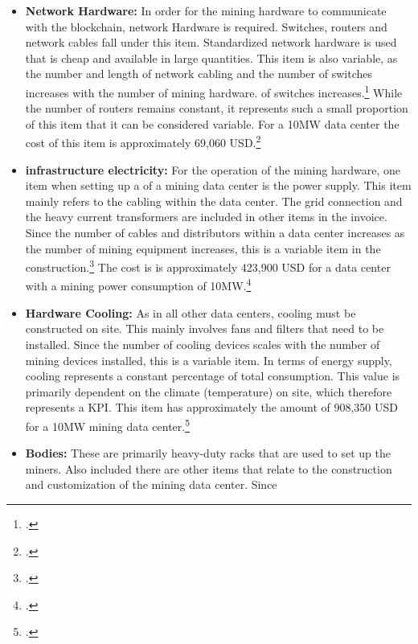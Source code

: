 \begin{itemize}
    The mining hardware item is variable as it is proportional to the number of miners. For a
    10MW data center, this would be approximately S19 2,987 per miner\footcite[Cf.][]{appendix:s19proassumptions} for a total price of
    of about 8,068,708 USD.\footcite[Cf.][]{appendix:capex}
    \item \textbf{Network Hardware: }In order for the mining hardware to communicate with the blockchain, network
    Hardware is required. Switches, routers and network cables fall under this item. Standardized network hardware is used
    that is cheap and available in large quantities. This item is also
    variable, as the number and length of network cabling and the number of switches increases with the number of mining hardware.
    of switches increases.\footcite[Cf.][]{appendix:capex} While the number of routers remains constant, it represents such a
    small proportion of this item that it can be considered variable. For a 10MW data center
    the cost of this item is approximately 69,060 USD.\footcite[Cf.][]{appendix:capex}
    \item \textbf{infrastructure electricity: }For the operation of the mining hardware, one item when setting up a
    of a mining data center is the power supply. This item mainly refers to the cabling within the data center.
    The grid connection and the heavy current transformers are included in other items in the invoice.
    Since the number of cables and distributors within a data center increases as the number of mining
    equipment increases, this is a variable item in the construction.\footcite[Cf.][]{appendix:capex} The cost is
    is approximately 423,900 USD for a data center with a mining power consumption of 10MW.\footcite[Cf.][]{appendix:capex}
    \item \textbf{Hardware Cooling: }As in all other data centers, cooling must be constructed on site.
    This mainly involves fans and filters that need to be installed.
    Since the number of cooling devices scales with the number of mining devices installed, this is a variable item.
    In terms of energy supply, cooling represents a constant percentage of total consumption.
    This value is primarily dependent on the climate (temperature) on site, which therefore represents a \ac{KPI}. This item
    has approximately the amount of 908,350 USD for a 10MW mining data center.\footcite[Cf.][]{appendix:capex}
    \item \textbf{Bodies: }These are primarily heavy-duty racks that are used to set up the miners.
    Also included there are other items that relate to the construction and customization of the mining data center. Since

\end{itemize}
